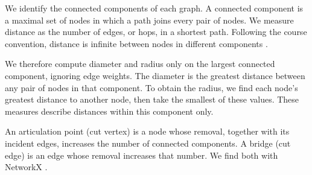 We identify the connected components of each graph. A connected component is
a maximal set of nodes in which a path joins every pair of nodes. We measure
distance as the number of edges, or hops, in a shortest path. Following the
course convention, distance is infinite between nodes in different
components \cite{quercini2026}.

We therefore compute diameter and radius only on the largest connected
component, ignoring edge weights. The diameter is the greatest distance
between any pair of nodes in that component. To obtain the radius, we find
each node's greatest distance to another node, then take the smallest of
these values. These measures describe distances within this component only.

An articulation point (cut vertex) is a node whose removal, together with its
incident edges, increases the number of connected components. A bridge (cut
edge) is an edge whose removal increases that number. We find both with
NetworkX \cite{hagberg2008}.
